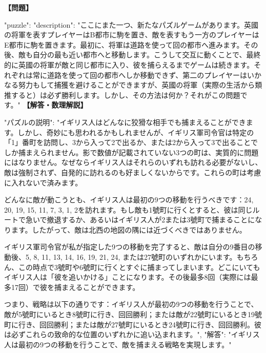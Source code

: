\documentclass[10pt,a4paper,oneside,openany]{ltjsbook}
\begin{document}
\begin{tcolorbox}[colback=softblue,colframe=primaryblue,title=\textbf{第 395 問：A WAR PUZZLE GAME.},arc=2mm,boxrule=1pt,breakable]
\textbf{【問題】}\par\vspace{0.3em}
{
  "puzzle": {
    "description": "ここにまた一つ、新たなパズルゲームがあります。英國の将軍を表すプレイヤーはB都市に駒を置き、敵を表すもう一方のプレイヤーはE都市に駒を置きます。最初に、将軍は道路を使って回の都市へ進みます。その後、敵も自分の最も近い都市へと移動します。こうして交互に動くことで、最終的に英國の将軍が敵と同じ都市に入り、彼を捕らえるまでゲームは続きます。それぞれは常に道路を使って回の都市へしか移動できず、第二のプレイヤーはいかなる努力もして捕獲を避けることができますが、英國の将軍（実際の生活から類推すると）は必ず勝利します。しかし、その方法は何か？それがこの問題です。"
  }
}
\tcblower
\textbf{【解答・数理解説】}\par\vspace{0.3em}
{
  "パズルの説明": "イギリス人はどんなに狡猾な相手でも捕まえることができます。しかし、奇妙にも思われるかもしれませんが、イギリス軍司令官は特定の「1」番町を訪問し、3から入って2で出るか、または2から入って3で出ることでしか捕まえられません。影で数値が記載されていない3つの町は、実質的に問題にはなりません。なぜならイギリス人はそれらのいずれも訪れる必要がないし、敵は強制されず、自発的に訪れるのも好ましくないからです。これらの町は考慮に入れないで済みます。

どんなに敵が動こうとも、イギリス人は最初の9つの移動を行うべきです：24, 20, 19, 15, 11, 7, 3, 1, 2を訪れます。もし敵も1號町に行くとすると、彼は同じルートで急いで撤退するか、あるいはイギリス人が2または3號町で捕まることになります。したがって、敵は北西の地図の隅には近づくべきではありません。

イギリス軍司令官が私が指定した9つの移動を完了すると、敵は自分の9番目の移動後、5, 8, 11, 13, 14, 16, 19, 21, 24, または27號町のいずれかにいます。もちろん、この時点で3號町や6號町に行くとすぐに捕まってしまいます。どこにいてもイギリス人は「彼を追いかける」ことになります。その後最多8回（実際には最多17回）で彼を捕まえることができます。

つまり、戦略は以下の通りです：イギリス人が最初の9つの移動を行うことで、敵が5號町にいるとき8號町に行き、回回勝利；または敵が22號町にいるとき19號町に行き、回回勝利；または敵が27號町にいるとき24號町に行き、回回勝利。彼は必ずこれらの致命的な位置のいずれかに追い込まれます。",
  "解答": "イギリス人は最初の9つの移動を行うことで、敵を捕まえる戦略を実現します。"
}
\end{tcolorbox}
\end{document}
